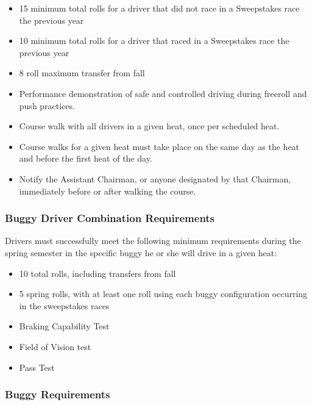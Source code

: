 	\begin{itemize}

		\item 15 minimum total rolls for a driver that did not race in a Sweepstakes race the previous year

		\item 10 minimum total rolls for a driver that raced in a Sweepstakes race the previous year

		\item 8 roll maximum transfer from fall

		\item Performance demonstration of safe and controlled driving during freeroll and push practices.

		\item Course walk with all drivers in a given heat, once per scheduled heat.

		\item Course walks for a given heat must take place on the same day as the heat and before the first heat of the day.

		\item Notify the Assistant Chairman, or anyone designated by that Chairman, immediately before or after walking the course.

	\end{itemize}

\subsubsection{Buggy Driver Combination Requirements}
	Drivers must successfully meet the following minimum requirements during the spring semester in the specific buggy he or she will drive in a given heat:

	\begin{itemize}

		\item 10 total rolls, including transfers from fall
		\item 5 spring rolls, with at least one roll using each buggy configuration occurring in the sweepstakes races
		\item Braking Capability Test
		\item Field of Vision test
		\item Pass Test

	\end{itemize}

\subsubsection{Buggy Requirements}

